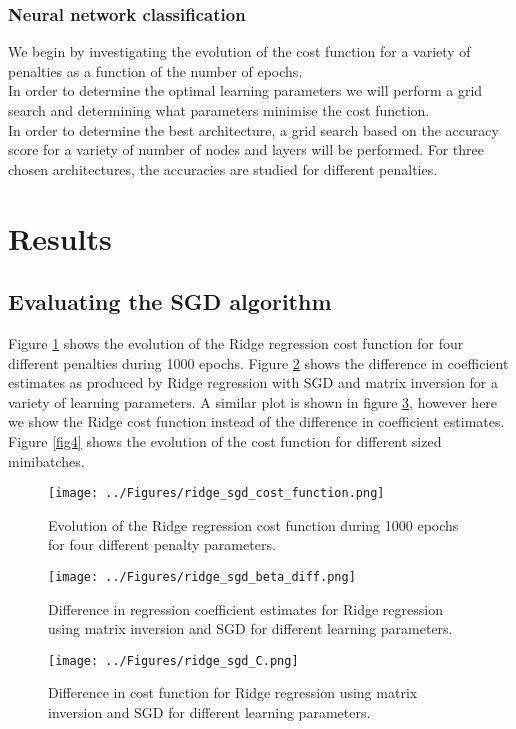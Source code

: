 \documentclass[notitlepage, reprint, nofootinbib]{revtex4-1}
\begin{document}
\subsubsection{Neural network classification}
We begin by investigating the evolution of the cost function for a variety of penalties as a function of the number of epochs. \\[2mm]
In order to determine the optimal learning parameters we will perform a grid search and determining what parameters minimise the cost function. \\[2mm]
In order to determine the best architecture, a grid search based on the accuracy score for a variety of number of nodes and layers will be performed. For three chosen architectures, the accuracies are studied for different penalties. 

\section{Results}
\subsection{Evaluating the SGD algorithm}
Figure \ref{fig1} shows the evolution of the Ridge regression cost function for four different penalties during 1000 epochs. Figure \ref{fig2} shows the difference in coefficient estimates as produced by Ridge regression with SGD and matrix inversion for a variety of learning parameters. A similar plot is shown in figure \ref{fig3}, however here we show the Ridge cost function instead of the difference in coefficient estimates. Figure \ref{fig4} shows the evolution of the cost function for different sized minibatches. 

\begin{figure}
	\centering 
	\texttt{[image: ../Figures/ridge\_sgd\_cost\_function.png]}
	\caption{Evolution of the Ridge regression cost function during 1000 epochs for four different penalty parameters.}
	\label{fig1}
\end{figure}

\begin{figure}
	\centering 
	\texttt{[image: ../Figures/ridge\_sgd\_beta\_diff.png]}
	\caption{Difference in regression coefficient estimates for Ridge regression using matrix inversion and SGD for different learning parameters.}
	\label{fig2}
\end{figure}

\begin{figure}
	\centering 
	\texttt{[image: ../Figures/ridge\_sgd\_C.png]}
	\caption{Difference in cost function for Ridge regression using matrix inversion and SGD for different learning parameters.}
	\label{fig3}
\end{figure}
\end{document}
